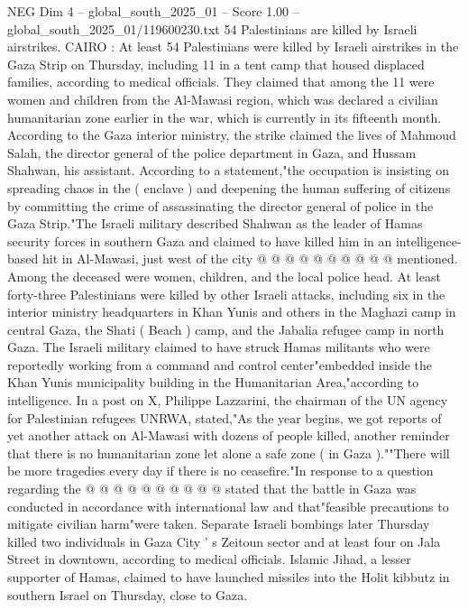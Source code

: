 \begin{textsample}{NEG Dim 4 – global\_south\_2025\_01 – Score 1.00 – global\_south\_2025\_01/119600230.txt}  \label{ex:f4_neg_447}
54 Palestinians are killed by Israeli airstrikes.
CAIRO : At least 54 Palestinians were killed by Israeli airstrikes in the Gaza Strip on Thursday, including 11 in a tent camp that housed displaced families, according to medical officials.
They claimed that among the 11 were women and children from the Al-Mawasi region, which was declared a civilian humanitarian zone earlier in the war, which is currently in its fifteenth month.
According to the Gaza interior ministry, the strike claimed the lives of Mahmoud Salah, the director general of the police department in Gaza, and Hussam Shahwan, his assistant.
According to a statement,"the occupation is insisting on spreading chaos in the ( enclave ) and deepening the human suffering of citizens by committing the crime of assassinating the director general of police in the Gaza Strip."The Israeli military described Shahwan as the leader of Hamas security forces in southern Gaza and claimed to have killed him in an intelligence-based hit in Al-Mawasi, just west of the city @ @ @ @ @ @ @ @ @ @ mentioned.
Among the deceased were women, children, and the local police head.
At least forty-three Palestinians were killed by other Israeli attacks, including six in the interior ministry headquarters in Khan Yunis and others in the Maghazi camp in central Gaza, the Shati ( Beach ) camp, and the Jabalia refugee camp in north Gaza.
The Israeli military claimed to have struck Hamas militants who were reportedly working from a command and control center"embedded inside the Khan Yunis municipality building in the Humanitarian Area,"according to intelligence.
In a post on X, Philippe Lazzarini, the chairman of the UN agency for Palestinian refugees UNRWA, stated,"As the year begins, we got reports of yet another attack on Al-Mawasi with dozens of people killed, another reminder that there is no humanitarian zone let alone a safe zone ( in Gaza ).""There will be more tragedies every day if there is no ceasefire."In response to a question regarding the @ @ @ @ @ @ @ @ @ @ stated that the battle in Gaza was conducted in accordance with international law and that"feasible precautions to mitigate civilian harm"were taken.
Separate Israeli bombings later Thursday killed two individuals in Gaza City ' s Zeitoun sector and at least four on Jala Street in downtown, according to medical officials.
Islamic Jihad, a lesser supporter of Hamas, claimed to have launched missiles into the Holit kibbutz in southern Israel on Thursday, close to Gaza.

\end{textsample}
